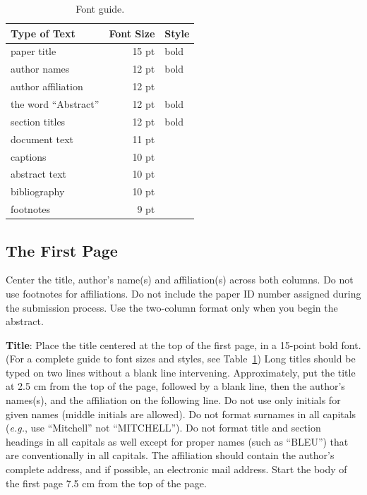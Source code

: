 \documentclass{article}
\begin{document}
\begin{table}[t!]
\begin{center}
\begin{tabular}{|l|rl|}
\hline \bf Type of Text & \bf Font Size & \bf Style \\ \hline
paper title & 15 pt & bold \\
author names & 12 pt & bold \\
author affiliation & 12 pt & \\
the word ``Abstract'' & 12 pt & bold \\
section titles & 12 pt & bold \\
document text & 11 pt  &\\
captions & 10 pt & \\
abstract text & 10 pt & \\
bibliography & 10 pt & \\
footnotes & 9 pt & \\
\hline
\end{tabular}
\end{center}
\caption{\label{font-table} Font guide. }
\end{table}

\subsection{The First Page}
\label{ssec:first}

Center the title, author's name(s) and affiliation(s) across both
columns. Do not use footnotes for affiliations. Do not include the
paper ID number assigned during the submission process. Use the
two-column format only when you begin the abstract.

{\bf Title}: Place the title centered at the top of the first page, in
a 15-point bold font. (For a complete guide to font sizes and styles,
see Table~\ref{font-table}) Long titles should be typed on two lines
without a blank line intervening. Approximately, put the title at 2.5
cm from the top of the page, followed by a blank line, then the
author's names(s), and the affiliation on the following line. Do not
use only initials for given names (middle initials are allowed). Do
not format surnames in all capitals ({\em e.g.}, use ``Mitchell'' not
``MITCHELL'').  Do not format title and section headings in all
capitals as well except for proper names (such as ``BLEU'') that are
conventionally in all capitals.  The affiliation should contain the
author's complete address, and if possible, an electronic mail
address. Start the body of the first page 7.5 cm from the top of the
page.
\end{document}
